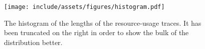 \begin{figure}[t]
  \centering
  \texttt{[image: include/assets/figures/histogram.pdf]}
  \caption{
    The histogram of the lengths of the resource-usage traces. It has been
    truncated on the right in order to show the bulk of the distribution better.
  }
  \vspace{-1.5em}
\end{figure}
